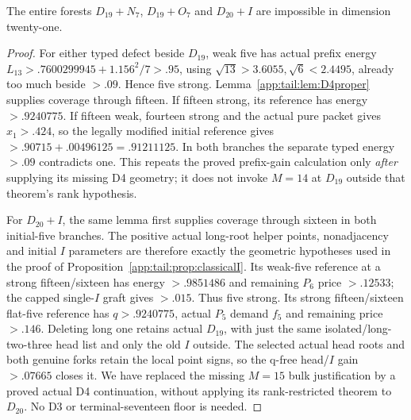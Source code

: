\begin{lemma}
\label{app:tail:lem:proper21}
The entire forests $D_{19}+N_7$, $D_{19}+O_7$ and $D_{20}+I$
are impossible in dimension twenty-one.
\end{lemma}
\begin{proof}
For either typed defect beside $D_{19}$, weak five has actual
prefix energy
$L_{13}>.7600299945+1.156^2/7>.95$, using
$\sqrt{13}>3.6055,\sqrt6<2.4495$, already too much beside $>.09$.
Hence five strong. Lemma~\ref{app:tail:lem:D4proper} supplies
coverage through fifteen. If fifteen strong, its reference has
energy $>.9240775$. If fifteen weak, fourteen strong and the
actual pure packet gives $x_1>.424$, so the legally modified
initial reference gives $>.90715+.00496125=.91211125$.
In both branches the separate typed energy $>.09$ contradicts one.
This repeats the proved prefix-gain calculation only \emph{after}
supplying its missing D4 geometry; it does not invoke $M=14$
at $D_{19}$ outside that theorem's rank hypothesis.

For $D_{20}+I$, the same lemma first supplies coverage through
sixteen in both initial-five branches. The positive actual long-root
helper points, nonadjacency and initial $I$ parameters are therefore
exactly the geometric hypotheses used in the proof of
Proposition~\ref{app:tail:prop:classicalI}. Its weak-five reference
at a strong fifteen/sixteen has energy $>.9851486$ and remaining
$P_6$ price $>.12533$; the capped single-$I$ graft gives $>.015$.
Thus five strong. Its strong fifteen/sixteen flat-five reference
has $q>.9240775$, actual $P_5$ demand $f_5$ and remaining price
$>.146$. Deleting long one retains actual $D_{19}$, with just the
same isolated/long-two-three head list and only the old $I$ outside.
The selected actual head roots and both genuine forks retain the
local point signs, so the q-free head/$I$ gain $>.07665$ closes it.
We have replaced the missing $M=15$ bulk justification by a proved
actual D4 continuation, without applying its rank-restricted theorem
to $D_{20}$. No D3 or terminal-seventeen floor is needed.
\end{proof}

